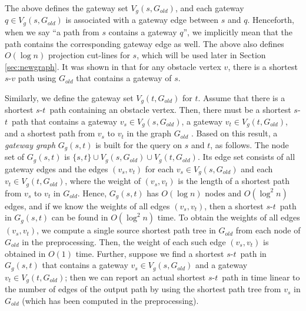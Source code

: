 \documentclass[english,runningheads,11pt]{llncs}
\def\st{$s$-$t$}
\begin{document}
The above defines the gateway set $V_g(s,G_{old})$, and each
gateway $q \in V_g(s,G_{old})$ is associated with a gateway edge between $s$ and $q$. Henceforth,
when we say ``a path from $s$ contains a gateway $q$'', we
implicitly mean that the path contains the corresponding gateway edge as well.
The above also defines $O(\log n)$ projection cut-lines for $s$, which will
be used later in Section \ref{sec:newgraph}.
It was shown in \cite{ref:ChenSh00} that for any obstacle vertex $v$,
there is a shortest $s$-$v$ path using $G_{old}$ that contains a gateway of $s$.

Similarly, we define the gateway set $V_g(t,G_{old})$  for $t$.
Assume that there is a shortest \st\ path containing an obstacle
vertex. Then, there must be a shortest \st\ path that contains a gateway
$v_s\in V_g(s,G_{old})$, a gateway $v_t\in V_g(t,G_{old})$, and a
shortest path from $v_s$ to $v_t$ in the graph $G_{old}$ \cite{ref:ChenSh00}. Based on
this result, a {\em gateway graph} $G_g(s,t)$ is built for the query
on $s$ and $t$, as follows. The node
set of $G_g(s,t)$ is $\{s,t\}\cup V_g(s,G_{old})\cup V_g(t,G_{old})$.
Its edge set consists of all gateway edges and the edges $(v_s,v_t)$
for each $v_s\in V_g(s,G_{old})$ and each $v_t\in V_g(t,G_{old})$,
where the weight of  $(v_s,v_t)$ is the length of a shortest path
from $v_s$ to $v_t$ in $G_{old}$. Hence, $G_g(s,t)$ has $O(\log n)$ nodes and
$O(\log^2 n)$ edges, and if we know the weights of all edges $(v_s,v_t)$,
then a shortest \st\ path in $G_g(s,t)$ can be found in
$O(\log^2 n)$ time. To obtain the weights of all edges $(v_s,v_t)$, we
compute a single source shortest path tree in $G_{old}$ from each node of $G_{old}$
in the preprocessing. Then, the weight of each such edge $(v_s,v_t)$
is obtained in $O(1)$ time. Further, suppose we find a shortest
\st\ path in $G_g(s,t)$ that contains a gateway $v_s\in
V_g(s,G_{old})$ and a gateway $v_t\in V_g(t,G_{old})$; then we can
report an actual shortest \st\ path in time linear to the
number of edges of the output path by using the shortest path tree from $v_s$
in $G_{old}$ (which has been computed in the preprocessing).
\end{document}
